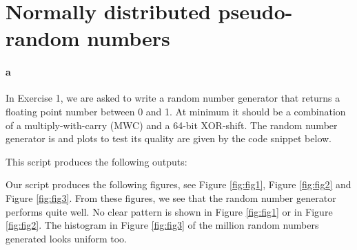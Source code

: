 \section{Normally distributed pseudo-random numbers}

\paragraph{a}
In Exercise 1, we are asked to write a random number generator that returns a floating point number between 0 and 1. At minimum it should be a combination of a multiply-with-carry (MWC) and a 64-bit XOR-shift. The random number generator is and plots to test its quality are given by the code snippet below.



This script produces the following outputs:


Our script produces the following figures, see Figure \ref{fig:fig1}, Figure \ref{fig:fig2} and Figure \ref{fig:fig3}. From these figures, we see that the random number generator performs quite well. No clear pattern is shown in Figure \ref{fig:fig1} or in Figure \ref{fig:fig2}. The histogram in Figure \ref{fig:fig3} of the million random numbers generated looks uniform too.

